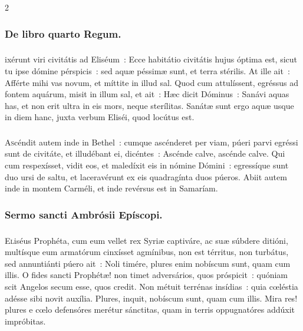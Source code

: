 \documentclass[9pt,twoside]{extarticle}
\begin{document}
\begin{multicols}{2}
{\subsubsection*{\center {}}

\subsubsection*{\center De libro quarto Regum.}
\subsubsection*{\center {}}
ixérunt viri civitátis ad Eliséum~: Ecce habitátio civitátis hujus óptima est, sicut tu ipse dómine pérspicis~: sed aquæ péssimæ sunt, et terra stérilis.
At ille ait~: Afférte mihi vas novum, et míttite in illud sal. Quod cum attulíssent,
egréssus ad fontem aquárum, misit in illum sal, et ait~: Hæc dicit Dóminus~: Sanávi aquas has, et non erit ultra in eis mors, neque sterílitas.
Sanátæ sunt ergo aquæ usque in diem hanc, juxta verbum Eliséi, quod locútus est.

\begin{tightlist}{}
\item {}
\end{tightlist}

\subsubsection*{\center {}}
\lettrine{A}scéndit autem inde in Bethel~: cumque ascénderet per viam, púeri parvi egréssi sunt de civitáte, et illudébant ei, dicéntes~: Ascénde calve, ascénde calve.
Qui cum respexísset, vidit eos, et maledíxit eis in nómine Dómini~: egressíque sunt duo ursi de saltu, et laceravérunt ex eis quadragínta duos púeros.
Abiit autem inde in montem Carméli, et inde revérsus est in Samaríam.

\subsubsection*{\center Sermo sancti Ambrósii Epíscopi.}
\subsubsection*{\center{}}
\lettrine{E}liséus Prophéta, cum eum vellet rex Syriæ captiváre, ac suæ súbdere ditióni, multísque eum armatórum cinxísset agmínibus, non est térritus, non turbátus, sed annuntiánti púero ait~: Noli timére, plures enim nobíscum sunt, quam cum illis. O fides sancti Prophétæ! non timet adversários, quos próspicit~: quóniam scit Angelos secum esse, quos credit. Non métuit terrénas insídias~: quia cœléstia adésse sibi novit auxília. Plures, inquit, nobíscum sunt, quam cum illis. Mira res! plures e cœlo defensóres merétur sánctitas, quam in terris oppugnatóres addúxit impróbitas.

}
\end{multicols}
\end{document}
